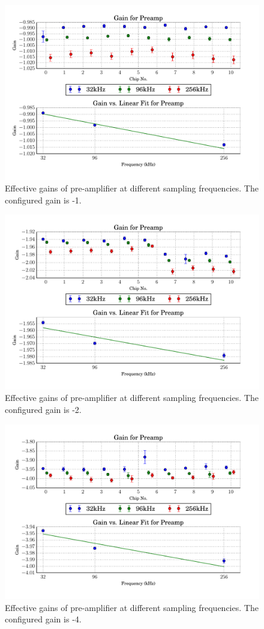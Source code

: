 \begin{figure}
    \centering
    \includegraphics[width=.85\linewidth]{images/plots/dc_slope_preamp_gain-1.pdf}
    \caption{Effective gains of pre-amplifier at different sampling frequencies. The configured gain is -1.}
    \label{fig:preamp_slope-1}
\end{figure}
\begin{figure}
    \centering
    \includegraphics[width=.85\linewidth]{images/plots/dc_slope_preamp_gain-2.pdf}
    \caption{Effective gains of pre-amplifier at different sampling frequencies. The configured gain is -2.}
    \label{fig:preamp_slope-2}
\end{figure}
\begin{figure}
    \centering
    \includegraphics[width=.85\linewidth]{images/plots/dc_slope_preamp_gain-4.pdf}
    \caption{Effective gains of pre-amplifier at different sampling frequencies. The configured gain is -4.}
    \label{fig:preamp_slope-4}
\end{figure}
